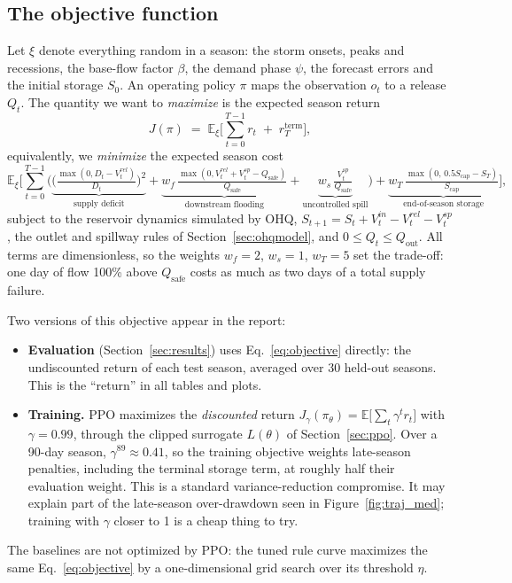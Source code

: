 \documentclass[11pt]{article}
\newcommand{\Scap}{S_{\mathrm{cap}}}
\newcommand{\Qsafe}{Q_{\mathrm{safe}}}
\begin{document}
\subsection{The objective function}\label{sec:objective}
Let $\xi$ denote everything random in a season: the storm onsets, peaks and
recessions, the base-flow factor $\beta$, the demand phase $\psi$, the
forecast errors and the initial storage $S_0$. An operating policy $\pi$ maps
the observation $o_t$ to a release $Q_t$. The quantity we want to
\emph{maximize} is the expected season return
\begin{equation}
J(\pi) \;=\; \mathbb{E}_{\xi}\Big[\sum_{t=0}^{T-1} r_t \;+\; r_T^{\mathrm{term}}\Big],
\label{eq:objective}
\end{equation}
equivalently, we \emph{minimize} the expected season cost
\[
\mathbb{E}_{\xi}\Big[\sum_{t=0}^{T-1}\Big(\underbrace{\Big(\tfrac{\max(0,D_t-V^{rel}_t)}{D_t}\Big)^2}_{\text{supply deficit}}
 + \underbrace{w_f\,\tfrac{\max(0,V^{rel}_t+V^{sp}_t-\Qsafe)}{\Qsafe}}_{\text{downstream flooding}}
 + \underbrace{w_s\,\tfrac{V^{sp}_t}{\Qsafe}}_{\text{uncontrolled spill}}\Big)
 + \underbrace{w_T\,\tfrac{\max(0,\,0.5\Scap-S_T)}{\Scap}}_{\text{end-of-season storage}}\Big],
\]
subject to the reservoir dynamics simulated by OHQ,
$S_{t+1}=S_t+V^{in}_t-V^{rel}_t-V^{sp}_t$, the outlet and spillway rules of
Section~\ref{sec:ohqmodel}, and $0\le Q_t\le Q_{\mathrm{out}}$. All terms
are dimensionless, so the weights $w_f=2$, $w_s=1$, $w_T=5$ set the
trade-off: one day of flow 100\% above $\Qsafe$ costs as much as two days of
a total supply failure.

Two versions of this objective appear in the report:
\begin{itemize}
\item \textbf{Evaluation} (Section~\ref{sec:results}) uses
Eq.~\eqref{eq:objective} directly: the undiscounted return of each test
season, averaged over 30 held-out seasons. This is the ``return'' in all
tables and plots.
\item \textbf{Training.} PPO maximizes the \emph{discounted} return
$J_\gamma(\pi_\theta)=\mathbb{E}\big[\sum_t \gamma^t r_t\big]$ with
$\gamma=0.99$, through the clipped surrogate $L(\theta)$ of
Section~\ref{sec:ppo}. Over a 90-day season, $\gamma^{89}\approx0.41$, so the
training objective weights late-season penalties, including the terminal
storage term, at roughly half their evaluation weight. This is a standard
variance-reduction compromise. It may explain part of the late-season
over-drawdown seen in Figure~\ref{fig:traj_med}; training with $\gamma$
closer to 1 is a cheap thing to try.
\end{itemize}
The baselines are not optimized by PPO: the tuned rule curve maximizes the
same Eq.~\eqref{eq:objective} by a one-dimensional grid search over its
threshold $\eta$.
\end{document}
